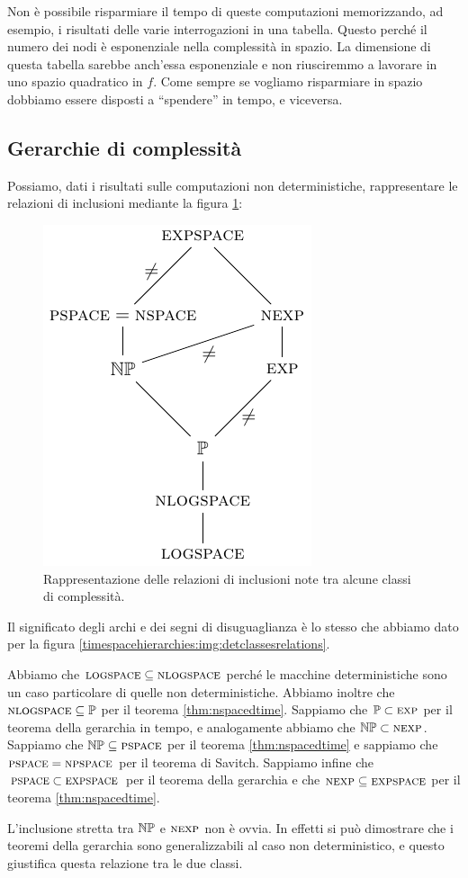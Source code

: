 Non è possibile risparmiare il tempo di queste computazioni memorizzando, ad esempio, i risultati
delle varie interrogazioni in una tabella. Questo perché il numero dei nodi è esponenziale nella
complessità in spazio. La dimensione di questa tabella sarebbe anch'essa esponenziale e non
riusciremmo a lavorare in uno spazio quadratico in $f$. Come sempre se vogliamo risparmiare in
spazio dobbiamo essere disposti a ``spendere'' in tempo, e viceversa.

\subsection{Gerarchie di complessità}

Possiamo, dati i risultati sulle computazioni non deterministiche, rappresentare le relazioni di
inclusioni mediante la figura \ref{nondeterminism:img:complexity_hierarchy}:

\begin{figure}[h]
    \begin{center}
        \includegraphics{./img/nondeterminism/Hierarchies.pdf}
        \caption{Rappresentazione delle relazioni di inclusioni note tra alcune classi di
        complessità.}
        \label{nondeterminism:img:complexity_hierarchy}
    \end{center}
\end{figure}

Il significato degli archi e dei segni di disuguaglianza è lo stesso che abbiamo dato per la figura
\ref{timespacehierarchies:img:detclassesrelations}.

Abbiamo che $\textsc{logspace} \subseteq \textsc{nlogspace}$ perché le macchine deterministiche sono un caso
particolare di quelle non deterministiche. Abbiamo inoltre che $\textsc{nlogspace} \subseteq \mathbb{P}$ per il
teorema \ref{thm:nspacedtime}. Sappiamo che $\mathbb{P} \subset \textsc{exp}$ per il teorema della gerarchia in
tempo, e analogamente abbiamo che $\mathbb{NP} \subset \textsc{nexp}$. Sappiamo che $\mathbb{NP} \subseteq \textsc{pspace}$
per il teorema \ref{thm:nspacedtime} e sappiamo che $\textsc{pspace} = \textsc{npspace}$ per il teorema di Savitch.
Sappiamo infine che $\textsc{pspace} \subset \textsc{expspace}$ per il teorema della gerarchia e che $\textsc{nexp}
\subseteq \textsc{expspace}$ per il teorema \ref{thm:nspacedtime}.

L'inclusione stretta tra $\mathbb{NP}$ e $\textsc{nexp}$ non è ovvia. In effetti si può dimostrare che i
teoremi della gerarchia sono generalizzabili al caso non deterministico, e questo giustifica questa
relazione tra le due classi.
